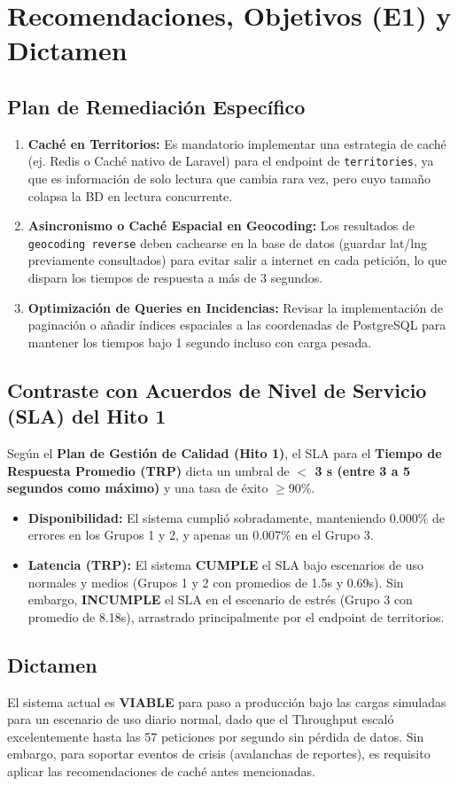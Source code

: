 \section{Recomendaciones, Objetivos (E1) y Dictamen}

\subsection{Plan de Remediación Específico}
\begin{enumerate}
    \item \textbf{Caché en Territorios:} Es mandatorio implementar una estrategia de caché (ej. Redis o Caché nativo de Laravel) para el endpoint de \texttt{territories}, ya que es información de solo lectura que cambia rara vez, pero cuyo tamaño colapsa la BD en lectura concurrente.
    \item \textbf{Asincronismo o Caché Espacial en Geocoding:} Los resultados de \texttt{geocoding reverse} deben cachearse en la base de datos (guardar lat/lng previamente consultados) para evitar salir a internet en cada petición, lo que dispara los tiempos de respuesta a más de 3 segundos.
    \item \textbf{Optimización de Queries en Incidencias:} Revisar la implementación de paginación o añadir índices espaciales a las coordenadas de PostgreSQL para mantener los tiempos bajo 1 segundo incluso con carga pesada.
\end{enumerate}

\subsection{Contraste con Acuerdos de Nivel de Servicio (SLA) del Hito 1}
Según el \textbf{Plan de Gestión de Calidad (Hito 1)}, el SLA para el \textbf{Tiempo de Respuesta Promedio (TRP)} dicta un umbral de \textbf{$<$ 3 s (entre 3 a 5 segundos como máximo)} y una tasa de éxito $\ge 90\%$.
\begin{itemize}
    \item \textbf{Disponibilidad:} El sistema cumplió sobradamente, manteniendo 0.000\% de errores en los Grupos 1 y 2, y apenas un 0.007\% en el Grupo 3.
    \item \textbf{Latencia (TRP):} El sistema \textbf{CUMPLE} el SLA bajo escenarios de uso normales y medios (Grupos 1 y 2 con promedios de 1.5s y 0.69s). Sin embargo, \textbf{INCUMPLE} el SLA en el escenario de estrés (Grupo 3 con promedio de 8.18s), arrastrado principalmente por el endpoint de territorios.
\end{itemize}

\subsection{Dictamen}
El sistema actual es \textbf{VIABLE} para paso a producción bajo las cargas simuladas para un escenario de uso diario normal, dado que el Throughput escaló excelentemente hasta las 57 peticiones por segundo sin pérdida de datos. Sin embargo, para soportar eventos de crisis (avalanchas de reportes), es requisito aplicar las recomendaciones de caché antes mencionadas.
